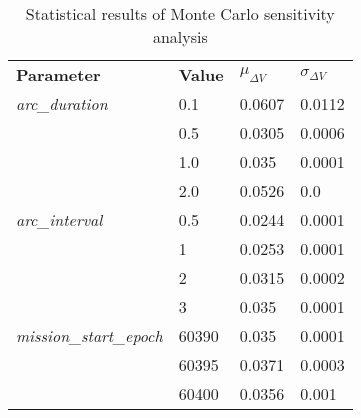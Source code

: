 
                \begin{table}[]
                \centering
                \begin{tabular}{l l l l}
                \rowcolor[HTML]{EFEFEF} \textbf{Parameter} & \textbf{Value} & \textbf{$\mu_{\Delta V}$} & \textbf{$\sigma_{\Delta V}$} \\
                \textit{arc\_duration} & 0.1 & 0.0607 & 0.0112 \\
 & 0.5 & 0.0305 & 0.0006 \\
 & 1.0 & 0.035 & 0.0001 \\
 & 2.0 & 0.0526 & 0.0 \\
\textit{arc\_interval} & 0.5 & 0.0244 & 0.0001 \\
 & 1 & 0.0253 & 0.0001 \\
 & 2 & 0.0315 & 0.0002 \\
 & 3 & 0.035 & 0.0001 \\
\textit{mission\_start\_epoch} & 60390 & 0.035 & 0.0001 \\
 & 60395 & 0.0371 & 0.0003 \\
 & 60400 & 0.0356 & 0.001 \\

                \end{tabular}
                \caption{Statistical results of Monte Carlo sensitivity analysis}
                \label{tab:SensitivityAnalysis}
                \end{table}
                